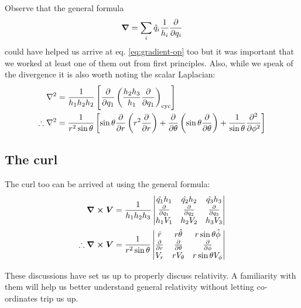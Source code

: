 \documentclass[english,seminar]{lecture}
\begin{document}
Observe that the general formula
\[
\boldsymbol{\nabla} = \sum_i \hat{q}_i {1\over h_i}{\partial\over\partial q_i}
\]
could have helped us arrive at eq. \eqref{eq:gradient-op} too but it was important that we worked at least one of them out from first principles. Also, while we speak of the divergence it is also worth noting the scalar Laplacian:
\begin{align}
	\nabla^2 &= {1\over h_1h_2h_2}\left[ {\partial\over\partial q_1} \left( {h_2h_3\over h_1}{\partial\over\partial q_1} \right)_{\textrm{cyc}} \right] \nonumber\\
	\therefore \nabla^2 &= {1\over r^2\sin\theta} \left[ \sin\theta {\partial\over\partial r}\left( r^2 {\partial\over\partial r}\right) + {\partial\over\partial \theta} \left(\sin\theta {\partial\over\partial\theta} \right) + {1\over\sin\theta} {\partial^2\over\partial \phi^2} \right] \label{eq:laplacian}
\end{align}

\subsection{The curl}
The curl too can be arrived at using the general formula:
\begin{align}
	\boldsymbol{\nabla \times V} &= {1\over h_1h_2h_3}
	\begin{vmatrix}
		\hat{q_1}h_1 & \hat{q_2}h_2 & \hat{q_3}h_3 \\
		{\partial\over\partial q_1} & {\partial\over\partial q_2} & {\partial\over\partial q_3} \\
		h_1V_1 & h_2V_2 & h_3V_3
	\end{vmatrix} \nonumber\\
	\therefore \boldsymbol{\nabla\times V} &= {1\over r^2\sin\theta}
	\begin{vmatrix}
		\hat{r} & r\hat{\theta} & r\sin\theta\hat{\phi} \\
		{\partial\over\partial r} & {\partial\over\partial \theta} & {\partial\over\partial \phi} \\
		V_r & rV_\theta & r\sin\theta V_\phi
	\end{vmatrix} \label{eq:curl-op}
\end{align}

These discussions have set us up to properly discuss relativity. A familiarity with them will help us better understand general relativity without letting co-ordinates trip us up.
\end{document}
